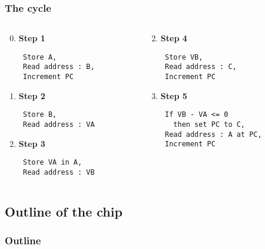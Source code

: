 \documentclass[slidestop]{beamer}
\begin{document}
\begin{frame}[fragile]
    \frametitle{The cycle}

    \begin{columns}[t]
        \begin{column}[T]{5cm}
    \begin{enumerate}
            \setcounter{enumi}{-1}

        \item \textbf{Step 1}
            \begin{lstlisting}
 Store A,
 Read address : B,
 Increment PC
            \end{lstlisting}
        \item \textbf{Step 2}
            \begin{lstlisting}
 Store B,
 Read address : VA
            \end{lstlisting}

        \item \textbf{Step 3}
            \begin{lstlisting}
 Store VA in A,
 Read address : VB
            \end{lstlisting}

    \end{enumerate}
\end{column}
\begin{column}[T]{5cm}
    \begin{enumerate}
        \setcounter{enumi}{1}
        \item \textbf{Step 4}
            \begin{lstlisting}
 Store VB,
 Read address : C,
 Increment PC
            \end{lstlisting}

        \item \textbf{Step 5}
            \begin{lstlisting}
 If VB - VA <= 0
   then set PC to C,
 Read address : A at PC,
 Increment PC
             \end{lstlisting}
    \end{enumerate}
\end{column}
\end{columns}

\end{frame}

\subsection{Outline of the chip}
\begin{frame}
    \frametitle{Outline}
    
\end{frame}
\end{document}
